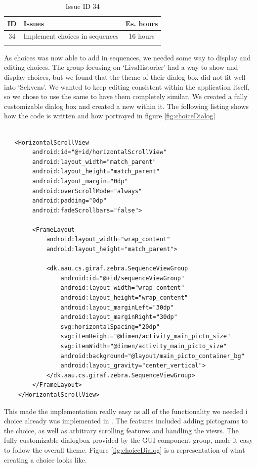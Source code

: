 \begin{longtable} { | c | p{12cm} | c | } 
\hline
	ID 	&	Issues	&		 Es. hours \\\hline
	34 	&	Implement choices in sequences	&	16 hours \\\hline
\caption{Issue ID 34}
\label{tab:spr3_choicesinsequences}
\end{longtable}

As choices was now able to add in sequences, we needed some way to display and editing choices. The group focusing on `LivsHistorier' had a way to show and display choices, but we found that the theme of their dialog box did not fit well into `Sekvens'. We wanted to keep editing consistent within the application itself, so we chose to use the same  to have them completely similar. We created a fully customizable dialog box and created a new  within it. The following listing shows how the code is written and how portrayed in figure \ref{fig:choiceDialog}

\begin{lstlisting}

   <HorizontalScrollView
        android:id="@+id/horizontalScrollView"
        android:layout_width="match_parent"
        android:layout_height="match_parent"
        android:layout_margin="0dp"
        android:overScrollMode="always"
        android:padding="0dp"
        android:fadeScrollbars="false">

        <FrameLayout
            android:layout_width="wrap_content"
            android:layout_height="match_parent">

            <dk.aau.cs.giraf.zebra.SequenceViewGroup
                android:id="@+id/sequenceViewGroup"
                android:layout_width="wrap_content"
                android:layout_height="wrap_content"
                android:layout_marginLeft="30dp"
                android:layout_marginRight="30dp"
                svg:horizontalSpacing="20dp"
                svg:itemHeight="@dimen/activity_main_picto_size"
                svg:itemWidth="@dimen/activity_main_picto_size"
                android:background="@layout/main_picto_container_bg"
                android:layout_gravity="center_vertical">
            </dk.aau.cs.giraf.zebra.SequenceViewGroup>
        </FrameLayout>
    </HorizontalScrollView>

\end{lstlisting}

This made the implementation really easy as all of the functionality we needed i choice already was implemented in . The features included adding pictograms to the choice, as well as arbitrary scrolling features and handling the views. The fully customizable dialogbox provided by the GUI-component group, made it easy to follow the overall theme. Figure \ref{fig:choiceDialog} is a representation of what creating a choice looks like.


